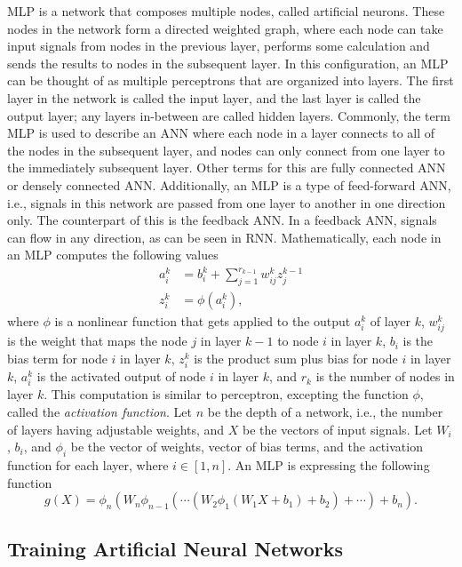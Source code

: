 \gls{MLP} is a network that composes multiple nodes, called artificial neurons.
These nodes in the network form a directed weighted graph, where each node can take input signals from nodes in the previous layer, performs some calculation and sends the results to nodes in the subsequent layer.
In this configuration, an \gls{MLP} can be thought of as multiple perceptrons that are organized into layers.
The first layer in the network is called the input layer, and the last layer is called the output layer; any layers in-between are called hidden layers.
Commonly, the term \gls{MLP} is used to describe an \gls{ANN} where each node in a layer connects to all of the nodes in the subsequent layer, and nodes can only connect from one layer to the immediately subsequent layer.
Other terms for this are fully connected \gls{ANN} or densely connected \gls{ANN}.
Additionally, an \gls{MLP} is a type of feed-forward \gls{ANN}, i.e., signals in this network are passed from one layer to another in one direction only.
The counterpart of this is the feedback \gls{ANN}.
In a feedback \gls{ANN}, signals can flow in any direction, as can be seen in \gls{RNN}.
Mathematically, each node in an \gls{MLP} computes the following values
\begin{align*}
    a_i^k &= b_i^k + \sum_{j=1}^{r_{k-1}} w_{ij}^k z_j^{k-1} \\
    z_i^k &= \phi (a_i^k),
\end{align*}
where $\phi$ is a nonlinear function that gets applied to the output $a_i^k$ of layer $k$, $w_{ij}^k$ is the weight that maps the node $j$ in layer $k - 1$ to node $i$ in layer $k$, $b_i$ is the bias term for node $i$ in layer $k$, $z_i^k$ is the product sum plus bias for node $i$ in layer $k$, $a_i^k$ is the activated output of node $i$ in layer $k$, and $r_k$ is the number of nodes in layer $k$.
This computation is similar to perceptron, excepting the function $\phi$, called the \textit{activation function}.
Let $n$ be the depth of a network, i.e., the number of layers having adjustable weights, and $X$ be the vectors of input signals.
Let $W_i$, $b_i$, and $\phi_i$ be the vector of weights, vector of bias terms, and the activation function for each layer, where $i \in [1, n]$.
An \gls{MLP} is expressing the following function
\begin{equation*}
    g(X) = \phi_n(W_n \phi_{n - 1}(\cdots (W_2 \phi_1(W_1 X + b_1) + b_2) + \cdots) + b_n).
\end{equation*}

\subsection{Training Artificial Neural Networks}
\label{sec:training-artificial-neural-networks}

